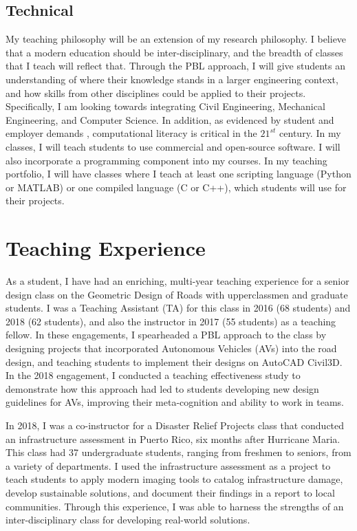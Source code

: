 \documentclass[12pt]{article}
\begin{document}
\subsection*{Technical}  
My teaching philosophy will be an extension of my research philosophy. I believe that a modern education should be inter-disciplinary, and the breadth of classes that I teach will reflect that. Through the PBL approach, I will give students an understanding of where their knowledge stands in a larger engineering context, and how skills from other disciplines could be applied to their projects. Specifically, I am looking towards integrating Civil Engineering, Mechanical Engineering, and Computer Science. In addition, as evidenced by student and employer demands \cite{magana2012motivation}, computational literacy is critical in the $21^{st}$ century. In my classes, I will teach students to use commercial and open-source software. I will also incorporate a programming component into my courses. In my teaching portfolio, I will have classes where I teach at least one scripting language (Python or MATLAB) or one compiled language (C or C++), which students will use for their projects. 

\section*{Teaching Experience}
As a student, I have had an enriching, multi-year teaching experience for a senior design class on the Geometric Design of Roads with upperclassmen and graduate students. I was a Teaching Assistant (TA) for this class in 2016 (68 students) and 2018 (62 students), and also the instructor in 2017 (55 students) as a teaching fellow. In these engagements, I spearheaded a PBL approach to the class by designing projects that incorporated Autonomous Vehicles (AVs) into the road design, and teaching students to implement their designs on AutoCAD Civil3D. In the 2018 engagement, I conducted a teaching effectiveness study to demonstrate how this approach had led to students developing new design guidelines for AVs, improving their meta-cognition and ability to work in teams.

In 2018, I was a co-instructor for a Disaster Relief Projects class that conducted an infrastructure assessment in Puerto Rico, six months after Hurricane Maria. This class had 37 undergraduate students, ranging from freshmen to seniors, from a variety of departments. I used the infrastructure assessment as a project to teach students to apply modern imaging tools to catalog infrastructure damage, develop sustainable solutions, and document their findings in a report to local communities. Through this experience, I was able to harness the strengths of an inter-disciplinary class for developing real-world solutions. 
\end{document}
